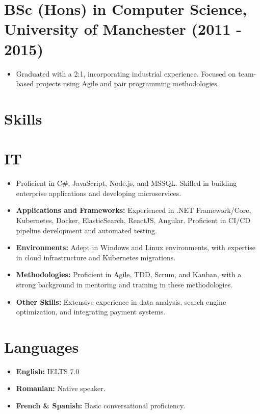 \documentclass[12pt,a4paper]{res}
\begin{document}
\begin{resume}
\section{\bf BSc (Hons) in Computer Science, University of Manchester (2011 - 2015)}
\begin{itemize}
\item Graduated with a 2:1, incorporating industrial experience. Focused on team-based projects using Agile and pair programming methodologies.
\end{itemize}

\section{\large\bf Skills}
\vspace{2mm}
\section{IT}
\begin{itemize}
\item Proficient in C\#, JavaScript, Node.js, and MSSQL. Skilled in building enterprise applications and developing microservices.
\item {\bf Applications and Frameworks:} Experienced in .NET Framework/Core, Kubernetes, Docker, ElasticSearch, ReactJS, Angular. Proficient in CI/CD pipeline development and automated testing.
\item {\bf Environments:} Adept in Windows and Linux environments, with expertise in cloud infrastructure and Kubernetes migrations.
\item {\bf Methodologies:} Proficient in Agile, TDD, Scrum, and Kanban, with a strong background in mentoring and training in these methodologies.
\item {\bf Other Skills:} Extensive experience in data analysis, search engine optimization, and integrating payment systems.
\end{itemize}

\section{Languages}
\begin{itemize}
\item {\bf English:} IELTS 7.0
\item {\bf Romanian:} Native speaker.
\item {\bf French \& Spanish:} Basic conversational proficiency.
\end{itemize}


\end{resume}
\end{document}
